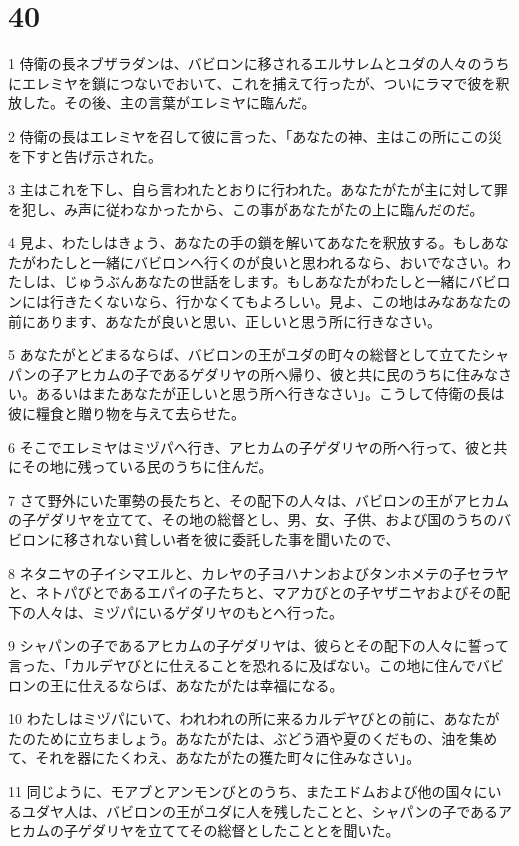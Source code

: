 \chapter{40}

\par 1 侍衛の長ネブザラダンは、バビロンに移されるエルサレムとユダの人々のうちにエレミヤを鎖につないでおいて、これを捕えて行ったが、ついにラマで彼を釈放した。その後、主の言葉がエレミヤに臨んだ。
\par 2 侍衛の長はエレミヤを召して彼に言った、「あなたの神、主はこの所にこの災を下すと告げ示された。
\par 3 主はこれを下し、自ら言われたとおりに行われた。あなたがたが主に対して罪を犯し、み声に従わなかったから、この事があなたがたの上に臨んだのだ。
\par 4 見よ、わたしはきょう、あなたの手の鎖を解いてあなたを釈放する。もしあなたがわたしと一緒にバビロンへ行くのが良いと思われるなら、おいでなさい。わたしは、じゅうぶんあなたの世話をします。もしあなたがわたしと一緒にバビロンには行きたくないなら、行かなくてもよろしい。見よ、この地はみなあなたの前にあります、あなたが良いと思い、正しいと思う所に行きなさい。
\par 5 あなたがとどまるならば、バビロンの王がユダの町々の総督として立てたシャパンの子アヒカムの子であるゲダリヤの所へ帰り、彼と共に民のうちに住みなさい。あるいはまたあなたが正しいと思う所へ行きなさい」。こうして侍衛の長は彼に糧食と贈り物を与えて去らせた。
\par 6 そこでエレミヤはミヅパへ行き、アヒカムの子ゲダリヤの所へ行って、彼と共にその地に残っている民のうちに住んだ。
\par 7 さて野外にいた軍勢の長たちと、その配下の人々は、バビロンの王がアヒカムの子ゲダリヤを立てて、その地の総督とし、男、女、子供、および国のうちのバビロンに移されない貧しい者を彼に委託した事を聞いたので、
\par 8 ネタニヤの子イシマエルと、カレヤの子ヨハナンおよびタンホメテの子セラヤと、ネトパびとであるエパイの子たちと、マアカびとの子ヤザニヤおよびその配下の人々は、ミヅパにいるゲダリヤのもとへ行った。
\par 9 シャパンの子であるアヒカムの子ゲダリヤは、彼らとその配下の人々に誓って言った、「カルデヤびとに仕えることを恐れるに及ばない。この地に住んでバビロンの王に仕えるならば、あなたがたは幸福になる。
\par 10 わたしはミヅパにいて、われわれの所に来るカルデヤびとの前に、あなたがたのために立ちましょう。あなたがたは、ぶどう酒や夏のくだもの、油を集めて、それを器にたくわえ、あなたがたの獲た町々に住みなさい」。
\par 11 同じように、モアブとアンモンびとのうち、またエドムおよび他の国々にいるユダヤ人は、バビロンの王がユダに人を残したことと、シャパンの子であるアヒカムの子ゲダリヤを立ててその総督としたこととを聞いた。

